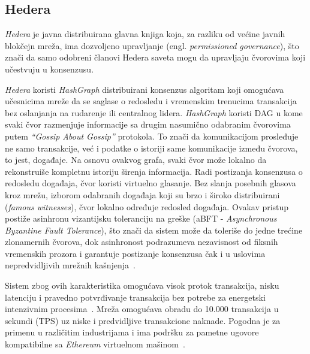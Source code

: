 
\subsection{Hedera}

\textit{Hedera} je javna distribuirana glavna knjiga koja, za razliku od većine javnih blokčejn mreža, ima dozvoljeno upravljanje (engl. \textit{permissioned governance}), što znači da samo odobreni članovi Hedera saveta mogu da upravljaju čvorovima koji učestvuju u konsenzusu.

\textit{Hedera} koristi \textit{HashGraph} distribuirani konsenzus algoritam koji omogućava učesnicima mreže da se saglase o redosledu i vremenskim trenucima transakcija bez oslanjanja na rudarenje ili centralnog lidera. \textit{HashGraph} koristi DAG u kome svaki čvor razmenjuje informacije sa drugim nasumično odabranim čvorovima putem \textit{\enquote{Gossip About Gossip}} protokola. To znači da komunikacijom prosleđuje ne samo transakcije, već i podatke o istoriji same komunikacije između čvorova, to jest, događaje. Na osnovu ovakvog grafa, svaki čvor može lokalno da rekonstruiše kompletnu istoriju širenja informacija. Radi postizanja konsenzusa o redosledu događaja, čvor koristi virtuelno glasanje. Bez slanja posebnih glasova kroz mrežu, izborom odabranih događaja koji su brzo i široko distribuirani (\textit{famous witnesses}), čvor lokalno određuje redosled događaja. Ovakav pristup postiže asinhronu vizantijsku toleranciju na greške (aBFT - \textit{Asynchronous Byzantine Fault Tolerance}), što znači da sistem može da toleriše do jedne trećine zlonamernih čvorova, dok asinhronost podrazumeva nezavisnost od fiksnih vremenskih prozora i garantuje postizanje konsenzusa čak i u uslovima nepredvidljivih mrežnih kašnjenja~\cite{baird HashGraph,coin HashGraph}.


Sistem zbog ovih karakteristika omogućava visok protok transakcija, nisku latenciju i pravedno potvrđivanje transakcija bez potrebe za energetski intenzivnim procesima~\cite{baird HashGraph,coin HashGraph}. Mreža omogućava obradu do 10.000 transakcija u sekundi (TPS) uz niske i predvidljive transakcione naknade. Pogodna je za primenu u različitim industrijama i ima podršku za pametne ugovore kompatibilne sa \textit{Ethereum} virtuelnom mašinom~\cite{hedera}.

